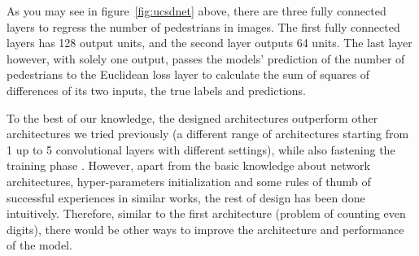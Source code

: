As you may see in figure~\ref{fig:ucsdnet} above, there are three fully connected layers to regress the number of pedestrians in images. The first fully connected layers has 128 output units, and the second layer outputs 64 units. The last layer however, with solely one output, passes the models' prediction of the number of pedestrians to the Euclidean loss layer to calculate the sum of squares of differences of its two inputs, the true labels and predictions. 

To the best of our knowledge, the designed architectures outperform other architectures we tried previously (a different range of architectures starting from 1 up to 5 convolutional layers with different settings), while also fastening the training phase . However, apart from the basic knowledge about network architectures, hyper-parameters initialization and some rules of thumb of successful experiences in similar works, the rest of design has been done intuitively. Therefore, similar to the first architecture (problem of counting even digits), there would be other ways to improve the architecture and performance of the model.


